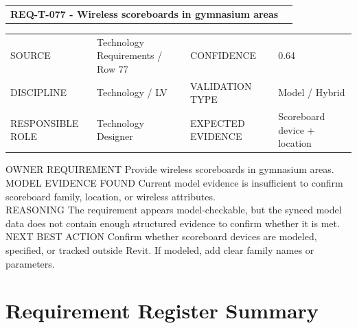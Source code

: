 \documentclass[10pt,letterpaper]{article}
\newcommand{\smalllabel}[1]{{\scriptsize\textcolor{emaMuted}{\MakeUppercase{#1}}}}
\newcommand{\badge}[3]{\tcbox[on line,colback=#2,colframe=#2,boxrule=0pt,arc=2mm,left=5pt,right=5pt,top=2pt,bottom=2pt]{\scriptsize\textbf{\textcolor{#3}{#1}}}}
\newcommand{\insufficientbadge}{\badge{Insufficient Model Data}{emaPurpleBg}{emaPurple}}
\begin{document}
\begin{tcolorbox}[colback=white,colframe=emaPurpleBg,boxrule=0.9pt,borderline west={3pt}{0pt}{emaPurple}]
\begin{tabularx}{\textwidth}{X r}
{\large\bfseries\textcolor{emaNavy}{REQ-T-077 - Wireless scoreboards in gymnasium areas}} & \insufficientbadge \\
\end{tabularx}
\begin{tabularx}{\textwidth}{p{1.25in}X p{1.1in}X}
\smalllabel{Source} & Technology Requirements / Row 77 & \smalllabel{Confidence} & 0.64 \\
\smalllabel{Discipline} & Technology / LV & \smalllabel{Validation Type} & Model / Hybrid \\
\smalllabel{Responsible Role} & Technology Designer & \smalllabel{Expected Evidence} & Scoreboard device + location \\
\end{tabularx}
\smalllabel{Owner Requirement} Provide wireless scoreboards in gymnasium areas.\\[3pt]
\smalllabel{Model Evidence Found} Current model evidence is insufficient to confirm scoreboard family, location, or wireless attributes.\\[3pt]
\smalllabel{Reasoning} The requirement appears model-checkable, but the synced model data does not contain enough structured evidence to confirm whether it is met.\\[3pt]
\smalllabel{Next Best Action} Confirm whether scoreboard devices are modeled, specified, or tracked outside Revit. If modeled, add clear family names or parameters.
\end{tcolorbox}

\section*{Requirement Register Summary}
\end{document}
